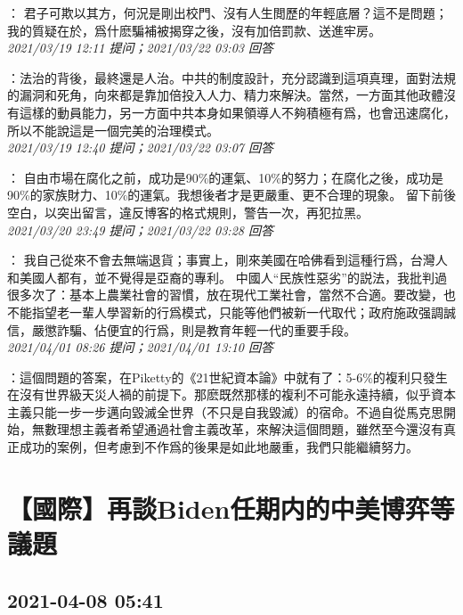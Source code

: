 \documentclass[twocolumn]{ctexart}
\begin{document}
：
君子可欺以其方，何況是剛出校門、沒有人生閲歷的年輕底層？這不是問題；我的質疑在於，爲什麽騙補被揭穿之後，沒有加倍罰款、送進牢房。
\\

\textit{\hfill\noindent\small 2021/03/19 12:11 提问；2021/03/22 03:03 回答}

：法治的背後，最終還是人治。中共的制度設計，充分認識到這項真理，面對法規的漏洞和死角，向來都是靠加倍投入人力、精力來解決。當然，一方面其他政體沒有這樣的動員能力，另一方面中共本身如果領導人不夠積極有爲，也會迅速腐化，所以不能說這是一個完美的治理模式。
\\

\textit{\hfill\noindent\small 2021/03/19 12:40 提问；2021/03/22 03:07 回答}

：
自由市場在腐化之前，成功是90\%的運氣、10\%的努力；在腐化之後，成功是90\%的家族財力、10\%的運氣。我想後者才是更嚴重、更不合理的現象。
留下前後空白，以突出留言，違反博客的格式規則，警告一次，再犯拉黑。
\\

\textit{\hfill\noindent\small 2021/03/20 23:49 提问；2021/03/22 03:28 回答}

：
我自己從來不會去無端退貨；事實上，剛來美國在哈佛看到這種行爲，台灣人和美國人都有，並不覺得是亞裔的專利。
中國人“民族性惡劣”的説法，我批判過很多次了：基本上農業社會的習慣，放在現代工業社會，當然不合適。要改變，也不能指望老一輩人學習新的行爲模式，只能等他們被新一代取代；政府施政强調誠信，嚴懲詐騙、佔便宜的行爲，則是教育年輕一代的重要手段。
\\

\textit{\hfill\noindent\small 2021/04/01 08:26 提问；2021/04/01 13:10 回答}

：這個問題的答案，在Piketty的《21世紀資本論》中就有了：5-6\%的複利只發生在沒有世界級天災人禍的前提下。那麽既然那樣的複利不可能永遠持續，似乎資本主義只能一步一步邁向毀滅全世界（不只是自我毀滅）的宿命。不過自從馬克思開始，無數理想主義者希望通過社會主義改革，來解決這個問題，雖然至今還沒有真正成功的案例，但考慮到不作爲的後果是如此地嚴重，我們只能繼續努力。
\\


\section{【國際】再談Biden任期内的中美博弈等議題}
\subsection{2021-04-08 05:41}
\end{document}
